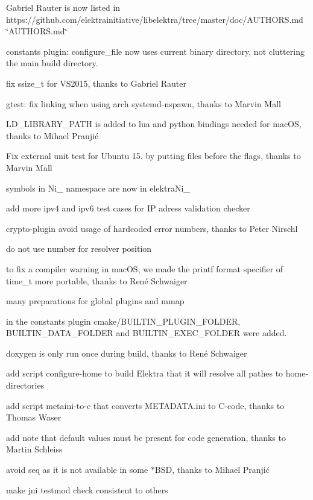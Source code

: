 \begin{DoxyItemize}
\item Gabriel Rauter is now listed in https\+://github.com/elektrainitiative/libelektra/tree/master/doc/\+A\+U\+T\+H\+O\+R\+S.\+md \char`\"{}\+A\+U\+T\+H\+O\+R\+S.\+md\char`\"{}
\item constants plugin\+: configure\+\_\+file now uses current binary directory, not cluttering the main build directory.
\item fix ssize\+\_\+t for V\+S2015, thanks to Gabriel Rauter
\item gtest\+: fix linking when using arch systemd-\/nspawn, thanks to Marvin Mall
\item {\ttfamily L\+D\+\_\+\+L\+I\+B\+R\+A\+R\+Y\+\_\+\+P\+A\+TH} is added to lua and python bindings needed for mac\+OS, thanks to Mihael Pranjić
\item Fix external unit test for Ubuntu 15. by putting files before the flags, thanks to Marvin Mall
\item symbols in {\ttfamily Ni\+\_\+} namespace are now in {\ttfamily elektra\+Ni\+\_\+}
\item add more ipv4 and ipv6 test cases for IP adress validation checker
\item crypto-\/plugin avoid usage of hardcoded error numbers, thanks to Peter Nirschl
\item do not use number for resolver position
\item to fix a compiler warning in mac\+OS, we made the printf format specifier of time\+\_\+t more portable, thanks to René Schwaiger
\item many preparations for global plugins and mmap
\item in the constants plugin {\ttfamily cmake/\+B\+U\+I\+L\+T\+I\+N\+\_\+\+P\+L\+U\+G\+I\+N\+\_\+\+F\+O\+L\+D\+ER}, {\ttfamily B\+U\+I\+L\+T\+I\+N\+\_\+\+D\+A\+T\+A\+\_\+\+F\+O\+L\+D\+ER} and {\ttfamily B\+U\+I\+L\+T\+I\+N\+\_\+\+E\+X\+E\+C\+\_\+\+F\+O\+L\+D\+ER} were added.
\item doxygen is only run once during build, thanks to René Schwaiger
\item add script configure-\/home to build Elektra that it will resolve all pathes to home-\/directories
\item add script metaini-\/to-\/c that converts M\+E\+T\+A\+D\+A\+T\+A.\+ini to C-\/code, thanks to Thomas Waser
\item add note that default values must be present for code generation, thanks to Martin Schleiss
\item avoid {\ttfamily seq} as it is not available in some {\ttfamily $\ast$\+B\+SD}, thanks to Mihael Pranjić
\item make jni testmod check consistent to others
\end{DoxyItemize}

